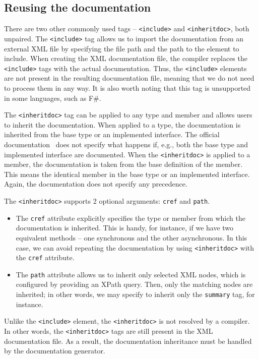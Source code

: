 \subsection{Reusing the documentation}
\label{sec:reusing-docs}

There are two other commonly used tags -- \texttt{<include>} and \texttt{<inheritdoc>}, both unpaired.
The \texttt{<include>} tag allows us to import the documentation from an external XML file by specifying the file path and the path to the element to include.
When creating the XML documentation file, the compiler replaces the \texttt{<include>} tags with the actual documentation.
Thus, the \texttt{<include>} elements are not present in the resulting documentation file, meaning that we do not need to process them in any way.
It is also worth noting that this tag is unsupported in some languages, such as F\#.

The \texttt{<inheritdoc>} tag can be applied to any type and member and allows users to inherit the documentation.
When applied to a type, the documentation is inherited from the base type or an implemented interface.
The official documentation~\cite{csharp_xml_tags_docs} does not specify what happens if, e.g., both the base type and implemented interface are documented.
When the \texttt{<inheritdoc>} is applied to a member, the documentation is taken from the base definition of the member.
This means the identical member in the base type or an implemented interface.
Again, the documentation does not specify any precedence.

The \texttt{<inheritdoc>} supports 2 optional arguments: \texttt{cref} and \texttt{path}.

\begin{itemize}
    \item The \texttt{cref} attribute explicitly specifies the type or member from which the documentation is inherited.
    This is handy, for instance, if we have two equivalent methods -- one synchronous and the other asynchronous.
    In this case, we can avoid repeating the documentation by using \texttt{<inheritdoc>} with the \texttt{cref} attribute.
    \item The \texttt{path} attribute allows us to inherit only selected XML nodes, which is configured by providing an XPath query.
    Then, only the matching nodes are inherited; in other words, we may specify to inherit only the \texttt{summary} tag, for instance.
\end{itemize}

Unlike the \texttt{<include>} element, the \texttt{<inheritdoc>} is not resolved by a compiler.
In other words, the \texttt{<inheritdoc>} tags are still present in the XML documentation file.
As a result, the documentation inheritance must be handled by the documentation generator.

